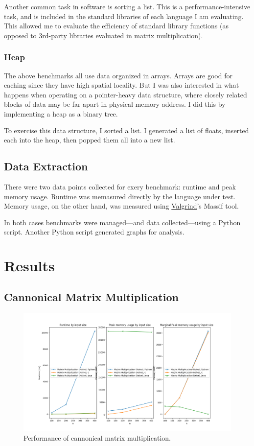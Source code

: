 \documentclass[12pt,letterpaper]{article}
\begin{document}
Another common task in software is sorting a list. This is a
performance-intensive task, and is included in the standard libraries of each
language I am evaluating. This allowed me to evaluate the efficiency of standard
library functions (as opposed to 3rd-party libraries evaluated in matrix
multiplication).

\subsubsection{Heap}

The above benchmarks all use data organized in arrays. Arrays are good for
caching since they have high spatial locality. But I was also interested in
what happens when operating on a pointer-heavy data structure, where closely
related blocks of data may be far apart in physical memory address. I did this
by implementing a heap as a binary tree.

To exercise this data structure, I sorted a list. I generated a list of
floats, inserted each into the heap, then popped them all into a new list.

\subsection{Data Extraction}

There were two data points collected for exery benchmark: runtime and peak
memory usage. Runtime was memasured directly by the language under test. Memory
usage, on the other hand, was measured using
\href{https://valgrind.org/}{Valgrind}'s Massif tool.

In both cases benchmarks were managed—and data collected—using a Python
script. Another Python script generated graphs for analysis.

\section{Results}

\subsection{Cannonical Matrix Multiplication}\label{matmul-cannonical}

\begin{figure}[h!]
  \centering
  \includegraphics[width=\textwidth]{./matmul_naïve-plot.png}
  \caption{Performance of cannonical matrix multiplication.}
  \label{plot-matmul-cannonical}
\end{figure}
\end{document}
